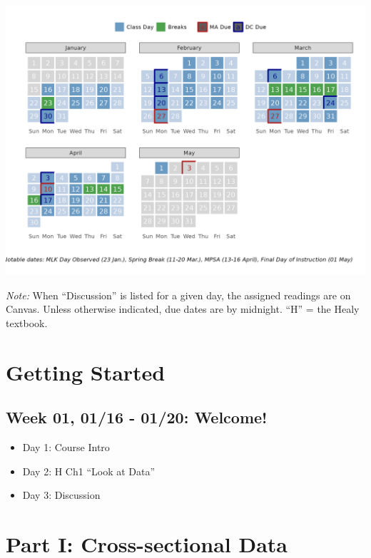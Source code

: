 \documentclass[11pt,]{article}
\begin{document}
\hrulefill

\includegraphics[width=1\linewidth]{schedule}

\singlespacing
\setlength{\parskip}{0pt}

\hrulefill

\bigskip

\emph{Note:} When ``Discussion'' is listed for a given day, the assigned
readings are on Canvas. Unless otherwise indicated, due dates are by
midnight. ``H'' = the Healy textbook.

\hypertarget{getting-started}{%
\section{Getting Started}\label{getting-started}}

\hypertarget{week-01-0116---0120-welcome}{%
\subsection{Week 01, 01/16 - 01/20:
Welcome!}\label{week-01-0116---0120-welcome}}

\begin{itemize}
\item
  Day 1: Course Intro
\item
  Day 2: H Ch1 ``Look at Data''
\item
  Day 3: Discussion
\end{itemize}

\hypertarget{part-i-cross-sectional-data}{%
\section{Part I: Cross-sectional
Data}\label{part-i-cross-sectional-data}}
\end{document}
